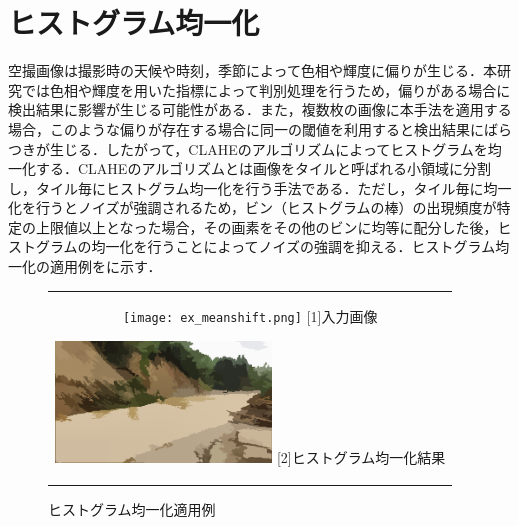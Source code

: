 \documentclass[../Thesis]{subfiles}
\begin{document}

\section{ヒストグラム均一化}
  空撮画像は撮影時の天候や時刻，季節によって色相や輝度に偏りが生じる．本研究では色相や輝度を用いた指標によって判別処理を行うため，偏りがある場合に検出結果に影響が生じる可能性がある．また，複数枚の画像に本手法を適用する場合，このような偏りが存在する場合に同一の閾値を利用すると検出結果にばらつきが生じる．したがって，CLAHEのアルゴリズム\cite{art07}によってヒストグラムを均一化する．CLAHEのアルゴリズムとは画像をタイルと呼ばれる小領域に分割し，タイル毎にヒストグラム均一化を行う手法である．ただし，タイル毎に均一化を行うとノイズが強調されるため，ビン（ヒストグラムの棒）の出現頻度が特定の上限値以上となった場合，その画素をその他のビンに均等に配分した後，ヒストグラムの均一化を行うことによってノイズの強調を抑える．ヒストグラム均一化の適用例をに示す．
  
  \begin{figure}[tbp]
  \begin{center}
    \begin{tabular}{c}
      \begin{minipage}{0.5\hsize}
        \begin{center}
          \texttt{[image: ex\_meanshift.png]}
          \hspace{1.7cm} [1]入力画像
        \end{center}
      \end{minipage}
      \begin{minipage}{0.5\hsize}
        \begin{center}
          \includegraphics[clip, width=5.75cm]{img/ex_equalization.png}
          \hspace{1.7cm} [2]ヒストグラム均一化結果
        \end{center}
      \end{minipage}
    \end{tabular}
    \caption{ヒストグラム均一化適用例}
    \label{img03}
  \end{center}
  \end{figure}
\end{document}
